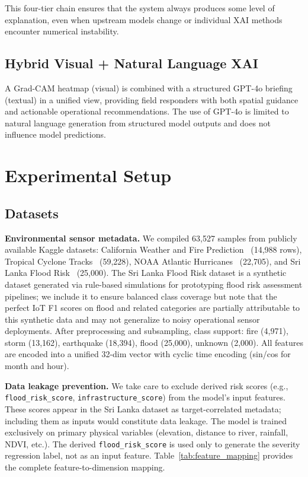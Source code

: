 \documentclass[journal]{IEEEtran}
\begin{document}
This four-tier chain ensures that the system always produces some level of explanation, even when upstream models change or individual XAI methods encounter numerical instability.

\subsection{Hybrid Visual + Natural Language XAI}

A Grad-CAM heatmap (visual) is combined with a structured GPT-4o briefing (textual) in a unified view, providing field responders with both spatial guidance and actionable operational recommendations. The use of GPT-4o is limited to natural language generation from structured model outputs and does not influence model predictions.

\section{Experimental Setup}

\subsection{Datasets}

\textbf{Environmental sensor metadata.} We compiled 63,527 samples from publicly available Kaggle datasets: California Weather and Fire Prediction~\cite{kaggle_fire} (14,988 rows), Tropical Cyclone Tracks~\cite{kaggle_cyclone_tracks} (59,228), NOAA Atlantic Hurricanes~\cite{kaggle_storm_atl} (22,705), and Sri Lanka Flood Risk~\cite{kaggle_srilanka_flood} (25,000). The Sri Lanka Flood Risk dataset is a synthetic dataset generated via rule-based simulations for prototyping flood risk assessment pipelines; we include it to ensure balanced class coverage but note that the perfect IoT F1 scores on flood and related categories are partially attributable to this synthetic data and may not generalize to noisy operational sensor deployments. After preprocessing and subsampling, class support: fire (4,971), storm (13,162), earthquake (18,394), flood (25,000), unknown (2,000). All features are encoded into a unified 32-dim vector with cyclic time encoding (sin/cos for month and hour).

\textbf{Data leakage prevention.} We take care to exclude derived risk scores (e.g., \texttt{flood\_risk\_score}, \texttt{infrastructure\_score}) from the model's input features. These scores appear in the Sri Lanka dataset as target-correlated metadata; including them as inputs would constitute data leakage. The model is trained exclusively on primary physical variables (elevation, distance to river, rainfall, NDVI, etc.). The derived \texttt{flood\_risk\_score} is used only to generate the severity regression label, not as an input feature. Table~\ref{tab:feature_mapping} provides the complete feature-to-dimension mapping.
\end{document}
